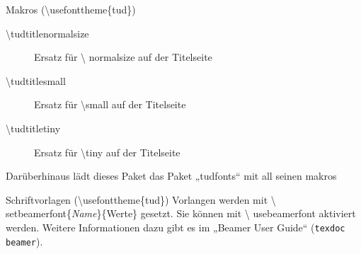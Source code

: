 \documentclass[presentation,t]{beamer}
\begin{document}
\begin{frame}[label={sec:org2925a5f}]{Makros (\textbackslash usefonttheme\{tud\})}
\begin{description}
\item[{\textbackslash tudtitlenormalsize}] Ersatz für \textbackslash
  normalsize auf der Titelseite
\item[{\textbackslash tudtitlesmall}] Ersatz für \textbackslash small auf der Titelseite
\item[{\textbackslash tudtitletiny}] Ersatz für \textbackslash tiny auf der Titelseite
\end{description}

Darüberhinaus lädt dieses Paket das Paket „tudfonts“ mit all seinen makros
\end{frame}

\begin{frame}[allowframebreaks]{Schriftvorlagen (\textbackslash usefonttheme\{tud\})}
Vorlangen werden mit \textbackslash
setbeamerfont\{\emph{Name}\}\{Werte\} gesetzt. Sie können mit \textbackslash
usebeamerfont aktiviert werden. Weitere Informationen dazu gibt es im
„Beamer User Guide“ (\texttt{texdoc beamer}).


\end{frame}
\end{document}
